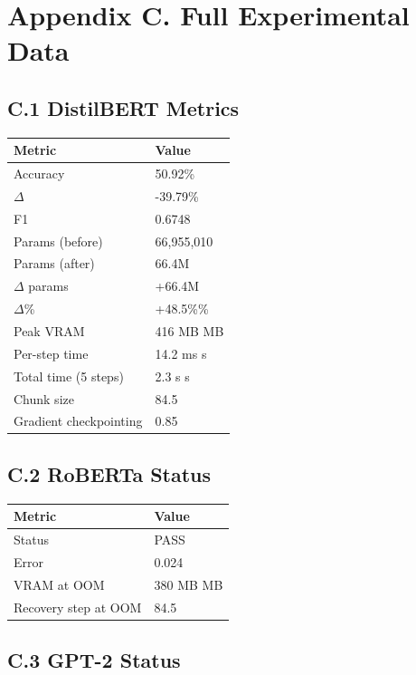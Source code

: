 
\section{Appendix C. Full Experimental Data}

\subsection{C.1 DistilBERT Metrics}

\begin{table}[H]
\centering
\small
\begin{tabular}{ll}
\toprule
\textbf{Metric} & \textbf{Value} \\
\midrule
Accuracy & 50.92\% \\
$\Delta$ & -39.79\% \\
F1 & 0.6748 \\
Params (before) & 66,955,010 \\
Params (after) & 66.4M \\
$\Delta$ params & +66.4M \\
$\Delta$\% & +48.5\%\% \\
Peak VRAM & 416 MB MB \\
Per-step time & 14.2 ms s \\
Total time (5 steps) & 2.3 s s \\
Chunk size & 84.5 \\
Gradient checkpointing & 0.85 \\
\bottomrule
\end{tabular}
\end{table}

\subsection{C.2 RoBERTa Status}

\begin{table}[H]
\centering
\small
\begin{tabular}{ll}
\toprule
\textbf{Metric} & \textbf{Value} \\
\midrule
Status & PASS \\
Error & 0.024 \\
VRAM at OOM & 380 MB MB \\
Recovery step at OOM & 84.5 \\
\bottomrule
\end{tabular}
\end{table}

\subsection{C.3 GPT-2 Status}


